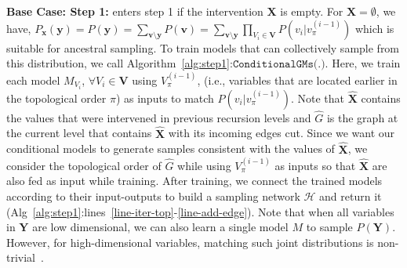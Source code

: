 \documentclass{article}
\newcommand{\h}{\mathcal{H}}
\newcommand{\x}{\mathbf{x}}
\newcommand{\y}{\mathbf{y}}
\newcommand{\X}{\mathbf{X}}
\newcommand{\Xp}{{\hat{\mathbf{X}}}}
\newcommand{\Gp}{{\hat{{G}}}}
\newcommand{\V}{\mathbf{V}}
\newcommand{\mbf}{\mathbf}
\newcommand{\data}{\mathcal{D}}
\newcommand{\idgen}{\text{ID-GEN}\xspace}
\newcommand{\condgm}{\texttt{ConditionalGMs(.)}\xspace}
\theoremstyle{plain}
\theoremstyle{definition}
\theoremstyle{remark}
\begin{document}
\textbf{Base Case: Step 1:} 
\idgen enters step 1 if the intervention $\X$ is empty. For $\X=\emptyset$, we have, $P_{\x}(\y) = P(\y)= \sum_{\mbf{v} \setminus \y} P(\mbf{v})= \sum_{\mbf{v} \setminus \y} \prod_{V_i\in \V} P(v_i| v_{\pi}^{(i-1)})$
which is suitable for ancestral sampling. To train models that can collectively sample from this distribution, we call Algorithm~\ref{alg:step1}:$\mathrm{\condgm}$. Here, we train each model $M_{V_i}$, $\forall V_i\in \V$ using $V_{\pi}^{(i-1)}$, (i.e., variables that are located earlier in the topological order $\pi$) as inputs to match $P(v_i| v_{\pi}^{(i-1)})$.
Note that $\Xp$ contains the values that were intervened in previous recursion levels and $\Gp$ is the graph at the current level that contains $\Xp$ with its incoming edges cut.
Since we want our conditional models to generate samples consistent with the values of $\Xp$, we consider the topological order of $\Gp$ while using $V_{\pi}^{(i-1)}$ as inputs so that $\Xp$ are also fed as input while training.
After training, we connect the trained models according to their input-outputs to build a sampling network $\h$ and return it (Alg~\ref{alg:step1}:lines~\ref{line-iter-top}-\ref{line-add-edge}). 
%
Note that when all variables in $\mathbf{Y}$ are low dimensional, we can also learn a single model $M$ to sample $P(\mathbf{Y})$.
However, for high-dimensional variables,
matching such joint distributions is non-trivial~\citep{rahman2024modular}.
%
%
%
%
%
%
%
%
%
%
%
%
%
\end{document}
